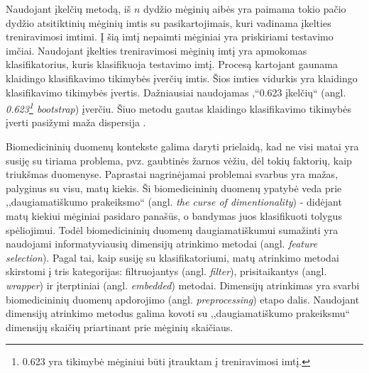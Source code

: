 Naudojant įkelčių metodą, iš $n$ dydžio mėginių aibės yra paimama tokio pačio dydžio atsitiktinių mėginių imtis su pasikartojimais, kuri vadinama įkelties treniravimosi imtimi. Į šią imtį nepaimti mėginiai yra priskiriami testavimo imčiai. Naudojant įkelties treniravimosi mėginių imtį yra apmokomas klasifikatorius, kuris klasifikuoja testavimo imtį. Procesą kartojant gaunama klaidingo klasifikavimo tikimybės įverčių imtis. Šios imties vidurkis yra klaidingo klasifikavimo tikimybės įvertis. Dažniausiai naudojamas ,“0.623 įkelčių`` (angl. \textit{0.623\footnote{0.623 yra tikimybė mėginiui būti įtrauktam į treniravimosi imtį.} bootstrap}) įverčiu. Šiuo metodu gautas klaidingo klasifikavimo tikimybės įverti pasižymi maža dispersija \cite{michie1994machine}.

Biomedicininių duomenų kontekste galima daryti prielaidą, kad ne visi matai yra susiję su tiriama problema, pvz. gaubtinės žarnos vėžiu, dėl tokių faktorių, kaip triukšmas duomenyse. Paprastai nagrinėjamai problemai svarbus yra mažas, palyginus su visu, matų kiekis. Ši biomedicininių duomenų ypatybė veda prie ,,daugiamatiškumo prakeiksmo`` (angl. \textit{the curse of dimentionality})\cite{bellman1966adaptive} - didėjant matų
kiekiui mėginiai pasidaro panašūs, o bandymas juos klasifikuoti tolygus spėliojimui. Todėl biomedicininių duomenų daugiamatiškumui sumažinti yra naudojami informatyviausių dimensijų atrinkimo metodai\cite{guyon2003introduction} (angl. \textit{feature selection}). Pagal tai, kaip susiję su klasifikatoriumi, matų atrinkimo metodai skirstomi į tris kategorijas\cite{saeys2008robust}: filtruojantys (angl. \textit{filter}), 
prisitaikantys (angl. \textit{wrapper}) ir įterptiniai (angl. \textit{embedded}) metodai. Dimensijų atrinkimas yra svarbi biomedicininių duomenų apdorojimo (angl. \textit{preprocessing}) etapo dalis. Naudojant dimensijų atrinkimo metodus galima kovoti su ,,daugiamatiškumo prakeiksmu`` dimensijų skaičių priartinant prie mėginių skaičiaus.




